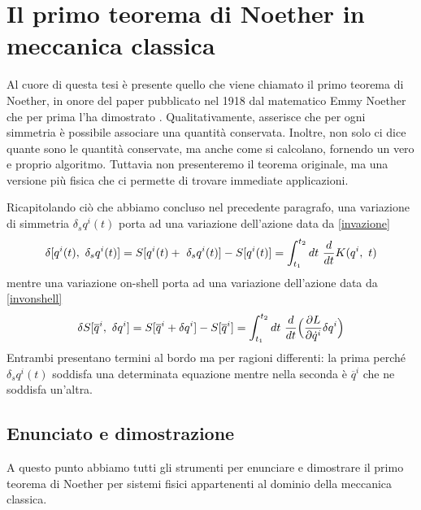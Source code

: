 \section{Il primo teorema di Noether in meccanica classica}
    Al cuore di questa tesi è presente quello che viene chiamato il primo teorema di Noether, in onore del paper pubblicato nel 1918 dal matematico Emmy Noether che per prima l'ha dimostrato \cite{noether}. Qualitativamente, asserisce che per ogni simmetria è possibile associare una quantità conservata. Inoltre, non solo ci dice quante sono le quantità conservate, ma anche come si calcolano, fornendo un vero e proprio algoritmo. Tuttavia non presenteremo il teorema originale, ma una versione più fisica che ci permette di trovare immediate applicazioni. 

    Ricapitolando ciò che abbiamo concluso nel precedente paragrafo, una variazione di simmetria $\delta_s q^i(t)$ porta ad una variazione dell'azione data da \eqref{invazione} 
\begin{equation*}
    \delta[q^i(t), ~\delta_s q^i(t)] = S[q^i(t) + ~\delta_s q^i(t)] - S[q^i(t)] = \int_{t_1}^{t_2}dt~ \frac{d}{dt} K(q^i, ~t)
\end{equation*}
    mentre una variazione on-shell porta ad una variazione dell'azione data da \eqref{invonshell} 
\begin{equation*}
    \delta S[\overline q^i,~\delta q^i] = S[\overline q^i + \delta q^i] - S[\overline q^i] = \int_{t_1}^{t_2}dt~ \frac{d}{dt} \Big( \frac{\partial L}{\partial\dot q^i} \delta q^i \Big )
\end{equation*}
    Entrambi presentano termini al bordo ma per ragioni differenti: la prima perché $\delta_s q^i(t)$ soddisfa una determinata equazione mentre nella seconda è $\overline q^i$ che ne soddisfa un'altra.

\subsection{Enunciato e dimostrazione}

    A questo punto abbiamo tutti gli strumenti per enunciare e dimostrare il primo teorema di Noether per sistemi fisici appartenenti al dominio della meccanica classica.

